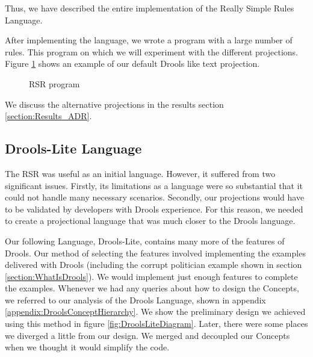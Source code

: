 Thus, we have described the entire implementation of the Really Simple Rules Language.

After implementing the language, we wrote a program with a large number of rules.
This program on which we will experiment with the different projections.
Figure \ref{fig:RSRProgram} shows an example of our default Drools like text projection.

\begin{figure}[h]
    \centering
    \caption{RSR program}
    \label{fig:RSRProgram}
\end{figure}

We discuss the alternative projections in the results section \ref{section:Results_ADR}.

\subsection{Drools-Lite Language}
\label{section:DroolsLite}

The RSR was useful as an initial language. 
However, it suffered from two significant issues.
Firstly, its limitations as a language were so substantial that it could not handle many necessary scenarios.
Secondly, our projections would have to be validated by developers with Drools experience.
For this reason, we needed to create a projectional language that was much closer to the Drools language.

Our following Language, Drools-Lite, contains many more of the features of Drools.
Our method of selecting the features involved implementing the examples delivered with Drools (including the corrupt politician example shown in section \ref{section:WhatIsDrools}).
We would implement just enough features to complete the examples.
Whenever we had any queries about how to design the Concepts, we referred to our analysis of the Drools Language, shown in appendix \ref{appendix:DroolsConceptHierarchy}.
We show the preliminary design we achieved using this method in figure \ref{fig:DroolsLiteDiagram}.
Later, there were some places we diverged a little from our design.
We merged and decoupled our Concepts when we thought it would simplify the code.

